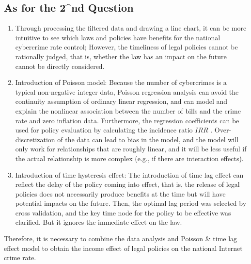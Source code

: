 \subsection{As for the 2^{nd} Question} %
    \begin{enumerate}
        \item Through processing the filtered data and drawing a line chart,
            it can be more intuitive to see which laws and policies have benefits for the national cybercrime rate control;
            However, the timeliness of legal policies cannot be rationally judged, that is,
            whether the law has an impact on the future cannot be directly considered.
        \item Introduction of Poisson model: Because the number of cybercrimes is a typical non-negative integer data,
            Poisson regression analysis can avoid the continuity assumption of ordinary linear regression,
            and can model and explain the nonlinear association between the number of bills and the crime rate and zero inflation data.
            Furthermore, the regression coefficients can be used for policy evaluation by calculating the incidence ratio $IRR$ .
            Over-discretization of the data can lead to bias in the model,
            and the model will only work for relationships that are roughly linear,
            and it will be less useful if the actual relationship is more complex (e.g., if there are interaction effects).
        \item Introduction of time hysteresis effect:
            The introduction of time lag effect can reflect the delay of the policy coming into effect, that is,
            the release of legal policies does not necessarily produce benefits at the time but will have potential impacts on the future.
            Then, the optimal lag period was selected by cross validation,
            and the key time node for the policy to be effective was clarified.
            But it ignores the immediate effect on the law.
    \end{enumerate}
    Therefore, it is necessary to combine the data analysis and Poisson \& time lag effect model
    to obtain the income effect of legal policies on the national Internet crime rate.

